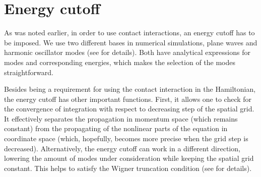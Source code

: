 \section{Energy cutoff}

As was noted earlier, in order to use contact interactions, an energy cutoff has to be imposed.
We use two different bases in numerical simulations, plane waves and harmonic oscillator modes (see  for details).
Both have analytical expressions for modes and corresponding energies, which makes the selection of the modes straightforward.

Besides being a requirement for using the contact interaction in the Hamiltonian, the energy cutoff has other important functions.
First, it allows one to check for the convergence of integration with respect to decreasing step of the spatial grid.
It effectively separates the propagation in momentum space (which remains constant) from the propagating of the nonlinear parts of the equation in coordinate space (which, hopefully, becomes more precise when the grid step is decreased).
Alternatively, the energy cutoff can work in a different direction, lowering the amount of modes under consideration while keeping the spatial grid constant.
This helps to satisfy the Wigner truncation condition (see  for details).

